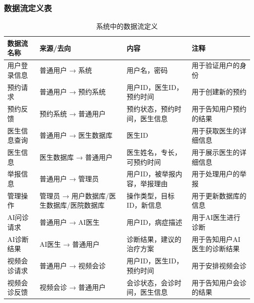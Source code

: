 \subsubsection{数据流定义表}
\begin{table}[htbp]
	\centering
	\begin{tabular}{|l|p{4cm}|p{4cm}|p{4cm}|}
		\hline
		\textbf{数据流名称} & \textbf{来源/去向} & \textbf{内容} & \textbf{注释} \\
		\hline
		用户登录信息 & 普通用户 
		→ 系统 & 用户名，密码 & 用于验证用户的身份 \\
		预约请求 & 普通用户 
		→ 预约系统 & 用户ID，医生ID，预约时间 & 用于创建新的预约 \\
		预约反馈 & 预约系统 
		→ 普通用户 & 预约状态，预约时间，医生信息 & 用于告知用户预约的结果 \\
		医生信息查询 & 普通用户 
		→ 医生数据库 & 医生ID & 用于获取医生的详细信息 \\
		医生信息 & 医生数据库 
		→ 普通用户 & 医生姓名，专长，可预约时间 & 用于展示医生的详细信息 \\
		举报信息 & 普通用户 
		→ 管理员 & 用户ID，被举报内容，举报理由 & 用于处理用户的举报 \\
		管理操作 & 管理员 
		→ 用户数据库/医生数据库/医院数据库 & 操作类型，目标ID，新信息 & 用于更新数据库的信息 \\
		AI问诊请求 & 普通用户 
		→ AI医生 & 用户ID，病症描述 & 用于AI医生进行诊断 \\
		AI诊断结果 & AI医生 
		→ 普通用户 & 诊断结果，建议的治疗方案 & 用于告知用户AI医生的诊断结果 \\
		视频会诊请求 & 普通用户 
		→ 视频会诊 & 用户ID，医生ID，预约时间 & 用于安排视频会诊 \\
		视频会诊反馈 & 视频会诊 
		→ 普通用户 & 会诊状态，会诊时间，医生信息 & 用于告知用户会诊的结果 \\
		\hline
	\end{tabular}
	\caption{系统中的数据流定义}
	\label{tab:data_flows}
\end{table}
\newpage

